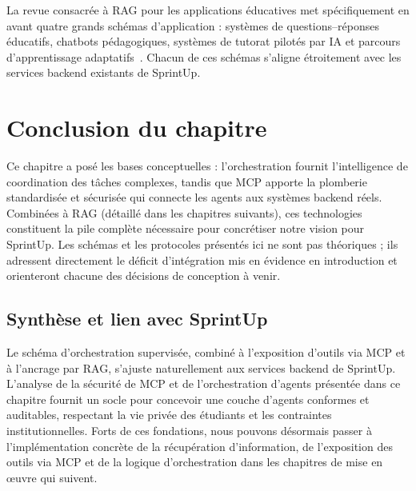 La revue consacrée à RAG pour les applications éducatives met spécifiquement en avant
quatre grands schémas d'application : systèmes de questions--réponses éducatifs,
chatbots pédagogiques, systèmes de tutorat pilotés par IA et parcours d'apprentissage
adaptatifs~\cite{rageducation,lirageducation}. Chacun de ces schémas s'aligne
étroitement avec les services backend existants de SprintUp.

\section{Conclusion du chapitre}

Ce chapitre a posé les bases conceptuelles : l'orchestration fournit l'intelligence de
coordination des tâches complexes, tandis que MCP apporte la plomberie standardisée et
sécurisée qui connecte les agents aux systèmes backend réels. Combinées à RAG (détaillé
dans les chapitres suivants), ces technologies constituent la pile complète nécessaire
pour concrétiser notre vision pour SprintUp. Les schémas et les protocoles présentés ici
ne sont pas théoriques ; ils adressent directement le déficit d'intégration mis en
évidence en introduction et orienteront chacune des décisions de conception à venir.

\subsection{Synthèse et lien avec SprintUp}

Le schéma d'orchestration supervisée, combiné à l'exposition d'outils via MCP et à
l'ancrage par RAG, s'ajuste naturellement aux services backend de SprintUp. L'analyse de
la sécurité de MCP et de l'orchestration d'agents présentée dans ce chapitre fournit un
socle pour concevoir une couche d'agents conformes et auditables, respectant la vie
privée des étudiants et les contraintes institutionnelles. Forts de ces fondations, nous
pouvons désormais passer à l'implémentation concrète de la récupération d'information,
de l'exposition des outils via MCP et de la logique d'orchestration dans les chapitres
de mise en \oe{}uvre qui suivent.
\newpage
